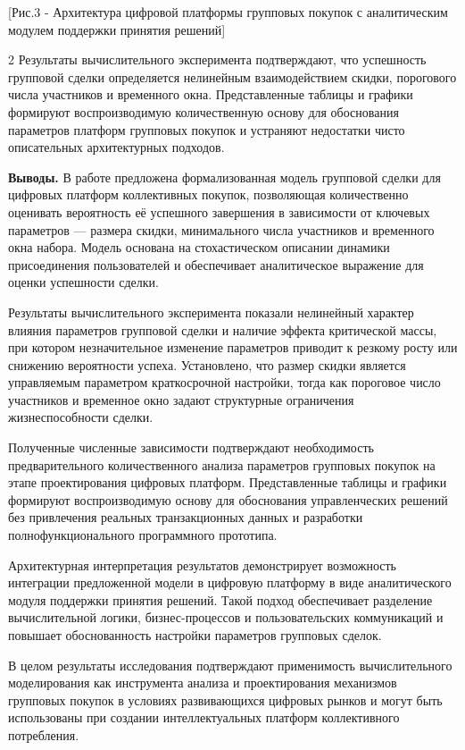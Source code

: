 [Рис.3 - Архитектура цифровой платформы групповых покупок с
аналитическим модулем поддержки принятия решений]

\begin{multicols}{2}
Результаты вычислительного эксперимента подтверждают, что успешность
групповой сделки определяется нелинейным взаимодействием скидки,
порогового числа участников и временного окна. Представленные таблицы и
графики формируют воспроизводимую количественную основу для обоснования
параметров платформ групповых покупок и устраняют недостатки чисто
описательных архитектурных подходов.

{\bfseries Выводы.} В работе предложена формализованная модель групповой
сделки для цифровых платформ коллективных покупок, позволяющая
количественно оценивать вероятность её успешного завершения в
зависимости от ключевых параметров --- размера скидки, минимального
числа участников и временного окна набора. Модель основана на
стохастическом описании динамики присоединения пользователей и
обеспечивает аналитическое выражение для оценки успешности сделки.

Результаты вычислительного эксперимента показали нелинейный характер
влияния параметров групповой сделки и наличие эффекта критической массы,
при котором незначительное изменение параметров приводит к резкому росту
или снижению вероятности успеха. Установлено, что размер скидки является
управляемым параметром краткосрочной настройки, тогда как пороговое
число участников и временное окно задают структурные ограничения
жизнеспособности сделки.

Полученные численные зависимости подтверждают необходимость
предварительного количественного анализа параметров групповых покупок на
этапе проектирования цифровых платформ. Представленные таблицы и графики
формируют воспроизводимую основу для обоснования управленческих решений
без привлечения реальных транзакционных данных и разработки
полнофункционального программного прототипа.

Архитектурная интерпретация результатов демонстрирует возможность
интеграции предложенной модели в цифровую платформу в виде
аналитического модуля поддержки принятия решений. Такой подход
обеспечивает разделение вычислительной логики, бизнес-процессов и
пользовательских коммуникаций и повышает обоснованность настройки
параметров групповых сделок.

В целом результаты исследования подтверждают применимость
вычислительного моделирования как инструмента анализа и проектирования
механизмов групповых покупок в условиях развивающихся цифровых рынков и
могут быть использованы при создании интеллектуальных платформ
коллективного потребления.


\end{multicols}
